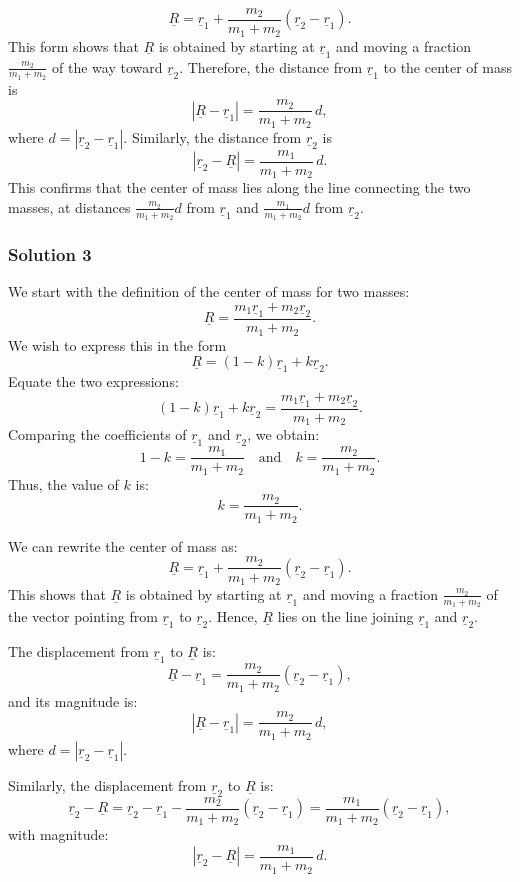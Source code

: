 \documentclass{article}
\begin{document}
\[
\underline{R} = \underline{r}_1 + \frac{m_2}{m_1+m_2}(\underline{r}_2 - \underline{r}_1).
\]
This form shows that \(\underline{R}\) is obtained by starting at \(\underline{r}_1\) and moving a fraction \(\frac{m_2}{m_1+m_2}\) of the way toward \(\underline{r}_2\). Therefore, the distance from \(\underline{r}_1\) to the center of mass is
\[
|\underline{R} - \underline{r}_1| = \frac{m_2}{m_1+m_2} \, d,
\]
where \(d = |\underline{r}_2 - \underline{r}_1|\). Similarly, the distance from \(\underline{r}_2\) is
\[
|\underline{r}_2 - \underline{R}| = \frac{m_1}{m_1+m_2} \, d.
\]
This confirms that the center of mass lies along the line connecting the two masses, at distances \(\frac{m_2}{m_1+m_2}d\) from \(\underline{r}_1\) and \(\frac{m_1}{m_1+m_2}d\) from \(\underline{r}_2\).


\subsubsection{Solution 3}
We start with the definition of the center of mass for two masses:
\[
\underline{R} = \frac{m_1 \underline{r}_1 + m_2 \underline{r}_2}{m_1+m_2}.
\]
We wish to express this in the form
\[
\underline{R} = (1-k)\underline{r}_1 + k\underline{r}_2.
\]
Equate the two expressions:
\[
(1-k)\underline{r}_1 + k\underline{r}_2 = \frac{m_1 \underline{r}_1 + m_2 \underline{r}_2}{m_1+m_2}.
\]
Comparing the coefficients of \(\underline{r}_1\) and \(\underline{r}_2\), we obtain:
\[
1-k = \frac{m_1}{m_1+m_2} \quad \text{and} \quad k = \frac{m_2}{m_1+m_2}.
\]
Thus, the value of \(k\) is:
\[
k = \frac{m_2}{m_1+m_2}.
\]

We can rewrite the center of mass as:
\[
\underline{R} = \underline{r}_1 + \frac{m_2}{m_1+m_2}(\underline{r}_2-\underline{r}_1).
\]
This shows that \(\underline{R}\) is obtained by starting at \(\underline{r}_1\) and moving a fraction \(\frac{m_2}{m_1+m_2}\) of the vector pointing from \(\underline{r}_1\) to \(\underline{r}_2\). Hence, \(\underline{R}\) lies on the line joining \(\underline{r}_1\) and \(\underline{r}_2\).

The displacement from \(\underline{r}_1\) to \(\underline{R}\) is:
\[
\underline{R}-\underline{r}_1 = \frac{m_2}{m_1+m_2}(\underline{r}_2-\underline{r}_1),
\]
and its magnitude is:
\[
|\underline{R}-\underline{r}_1| = \frac{m_2}{m_1+m_2}\,d,
\]
where \(d = |\underline{r}_2-\underline{r}_1|\).

Similarly, the displacement from \(\underline{r}_2\) to \(\underline{R}\) is:
\[
\underline{r}_2-\underline{R} = \underline{r}_2 - \underline{r}_1 - \frac{m_2}{m_1+m_2}(\underline{r}_2-\underline{r}_1) = \frac{m_1}{m_1+m_2}(\underline{r}_2-\underline{r}_1),
\]
with magnitude:
\[
|\underline{r}_2-\underline{R}| = \frac{m_1}{m_1+m_2}\,d.
\]
\end{document}
